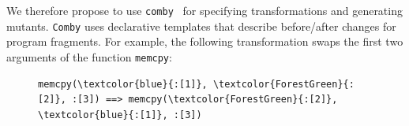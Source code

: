 
We therefore propose to use {\tt comby}~\cite{comby-github, rvt-ppc} for specifying
transformations and generating mutants. {\tt Comby} uses
declarative templates that describe before/after changes for program fragments. For example, the following transformation swaps the first two arguments of the function {\tt memcpy}:

\begin{figure}[!h]
\centering
\begin{BVerbatim}[commandchars=\\\{\}]
memcpy(\textcolor{blue}{:[1]}, \textcolor{ForestGreen}{:[2]}, :[3]) ==> memcpy(\textcolor{ForestGreen}{:[2]}, \textcolor{blue}{:[1]}, :[3])
\end{BVerbatim}
\end{figure}

